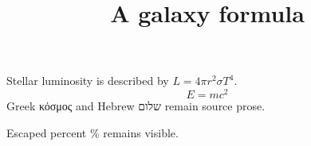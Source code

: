 \documentclass{article}
\title{A galaxy formula}
\begin{document}
Stellar luminosity is described by \(L=4\pi r^2\sigma T^4\).
\begin{equation}
E=mc^2
\end{equation}
Greek κόσμος and Hebrew שלום remain source prose. %

Escaped percent \% remains visible.
\end{document}

